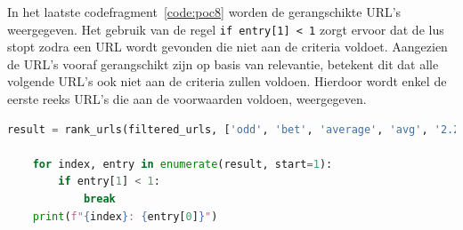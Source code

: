 In het laatste codefragment~\ref{code:poc8} worden de gerangschikte URL's weergegeven. Het gebruik van de regel \lstinline|if entry[1] < 1| zorgt ervoor dat de lus stopt zodra een URL wordt gevonden die niet aan de criteria voldoet. Aangezien de URL's vooraf gerangschikt zijn op basis van relevantie, betekent dit dat alle volgende URL's ook niet aan de criteria zullen voldoen. Hierdoor wordt enkel de eerste reeks URL's die aan de voorwaarden voldoen, weergegeven.
\begin{lstlisting}[language=python, captionpos=b, caption={Filteren van performance-logs }, label={code:poc8},float=h]
    result = rank_urls(filtered_urls, ['odd', 'bet', 'average', 'avg', '2.24', '1.70'])

    for index, entry in enumerate(result, start=1):
        if entry[1] < 1:
            break
    print(f"{index}: {entry[0]}")
\end{lstlisting}

